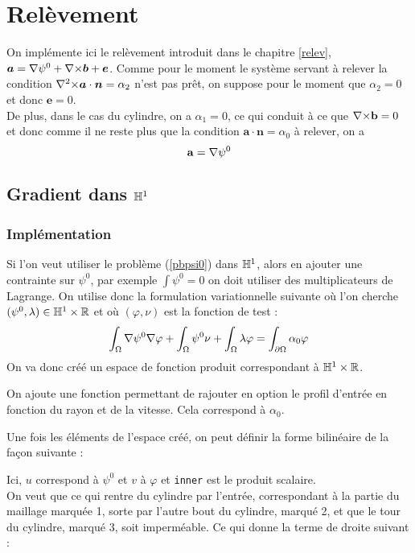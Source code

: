 \chapter{Relèvement}
On implémente ici le relèvement introduit dans le chapitre \ref{relev}, $\bm{a}={\nabla}\psi^0+{\nabla\times}\bm{b}+\bm{e}$. Comme pour le moment le système servant à relever la condition ${\nabla^2\times}\bm{a}\cdot\bm{n}=\alpha_2$ n'est pas prêt, on suppose pour le moment que $\alpha_2=0$ et donc $\bm{e}=0$.\\
De plus, dans le cas du cylindre, on a $\alpha_1=0$, ce qui conduit à ce que ${\nabla\times} \mathbf{b}=0$ et donc comme il ne reste plus que la condition $\bm{a}\cdot\bm{n}=\alpha_0$ à relever, on a \[ \mathbf{a}={\nabla}\psi^0 \]

\section{Gradient dans ${\mathbb{H}}^1$}
\label{impGradh1}
\subsection{Implémentation}
Si l'on veut utiliser le problème (\ref{pbpsi0}) dans ${\mathbb{H}}^1$, alors en ajouter une contrainte sur $\psi^0$, par exemple $\int \psi^0 = 0$ on doit utiliser des multiplicateurs de Lagrange. On utilise donc la formulation variationnelle suivante où l'on cherche $(\psi^0,\lambda)\in {\mathbb{H}}^1\times{\mathbb{R}}$ et où $(\varphi,\nu)$ est la fonction de test :
\[ \int_\Omega{\nabla} \psi^0{\nabla}\varphi + \int_\Omega \psi^0\nu + \int_\Omega \lambda\varphi = \int_{\partial\Omega} \alpha_0\varphi \]
On va donc créé un espace de fonction produit correspondant à ${\mathbb{H}}^1\times{\mathbb{R}}$.



On ajoute une fonction permettant de rajouter en option le profil d'entrée en fonction du rayon et de la vitesse. Cela correspond à $\alpha_0$.



Une fois les éléments de l'espace créé, on peut définir la forme bilinéaire de la façon suivante :



Ici, $u$ correspond à $\psi^0$ et $v$ à $\varphi$ et \texttt{inner} est le produit scalaire.\\

On veut que ce qui rentre du cylindre par l'entrée, correspondant à la partie du maillage marquée 1, sorte par l'autre bout du cylindre, marqué 2, et que le tour du cylindre, marqué 3, soit imperméable. Ce qui donne la terme de droite suivant :

